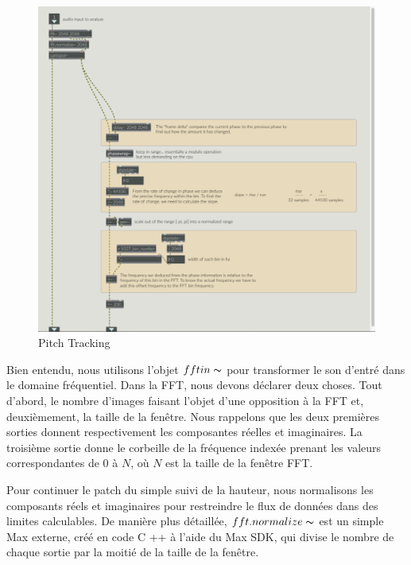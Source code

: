     
    \begin{figure}
        \centering
        \includegraphics[width = \textwidth ]{Graphs/fftTrack.png}
        \caption{Pitch Tracking}
        \label{PitchTracking}
    \end{figure}
Bien entendu, nous utilisons l'objet $ fftin \thicksim $ pour transformer le son d’entré dans le domaine fréquentiel. Dans la FFT, nous devons déclarer deux choses. Tout d'abord, le nombre d'images faisant l'objet d'une opposition à la FFT et, deuxièmement, la taille de la fenêtre. Nous rappelons que les deux premières sorties donnent respectivement les composantes réelles et imaginaires. La troisième sortie donne le corbeille de la fréquence indexée prenant les valeurs correspondantes de $ 0 $ à $ N $, où $ N $ est la taille de la fenêtre FFT.

Pour continuer le patch du simple suivi de la hauteur, nous normalisons les composants réels et imaginaires pour restreindre le flux de données dans des limites calculables. De manière plus détaillée, $ fft.normalize \thicksim $ est un simple Max externe, créé en code C ++ à l'aide du Max SDK, qui divise le nombre de chaque sortie par la moitié de la taille de la fenêtre.

